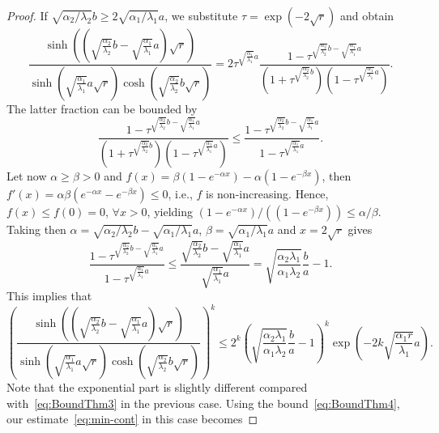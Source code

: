 \documentclass[10pt,a4paper]{amsart}
\begin{document}
\begin{proof}
If $\sqrt{\alpha_2/\lambda_2} b \geq 2\sqrt{\alpha_1/\lambda_1} a$, we substitute $\tau=\exp(-2\sqrt{r})$ and obtain 
\[\frac{\sinh\left(\left(\sqrt{\frac{\alpha_2}{\lambda_2}} b - \sqrt{\frac{\alpha_1}{\lambda_1}} a \right) \sqrt{r} \right)}{\sinh\left(\sqrt{\frac{\alpha_1}{\lambda_1}} a \sqrt{r}\right)\cosh\left(\sqrt{\frac{\alpha_2}{\lambda_2}} b \sqrt{r}\right)}
= 2 \tau^{\sqrt{\frac{\alpha_1}{\lambda_1}} a}\frac{1-\tau^{\sqrt{\frac{\alpha_2}{\lambda_2}} b-\sqrt{\frac{\alpha_1}{\lambda_1}} a}}{\left(1+\tau^{\sqrt{\frac{\alpha_2}{\lambda_2}} b}\right)\left(1-\tau^{\sqrt{\frac{\alpha_1}{\lambda_1}} a}\right)}.\] 
The latter fraction can be bounded by
\[\frac{1-\tau^{\sqrt{\frac{\alpha_2}{\lambda_2}} b-\sqrt{\frac{\alpha_1}{\lambda_1}} a}}{\left(1+\tau^{\sqrt{\frac{\alpha_2}{\lambda_2}} b}\right)\left(1-\tau^{\sqrt{\frac{\alpha_1}{\lambda_1}} a}\right)} 
\leq \frac{1-\tau^{\sqrt{\frac{\alpha_2}{\lambda_2}} b-\sqrt{\frac{\alpha_1}{\lambda_1}} a}}{1-\tau^{\sqrt{\frac{\alpha_1}{\lambda_1}} a}}.\] 
Let now $\alpha \geq \beta >0$ and $f(x) = \beta(1 - e^{-\alpha x}) - \alpha(1 - e^{-\beta x})$, then $f'(x) = \alpha\beta(e^{-\alpha x} - e^{-\beta x}) \leq 0$, i.e., $f$ is non-increasing. Hence, $f(x) \leq f(0) = 0$, $\forall x > 0$, yielding $(1 - e^{-\alpha x})/((1 - e^{-\beta x})) \leq \alpha/\beta$. Taking then $\alpha = \sqrt{\alpha_2/\lambda_2} b - \sqrt{\alpha_1/\lambda_1} a$, $\beta = \sqrt{\alpha_1/\lambda_1} a$ and $x = 2\sqrt{r}$ gives
\begin{equation}\label{eq:bound-exp}
	\frac{1-\tau^{\sqrt{\frac{\alpha_2}{\lambda_2}} b-\sqrt{\frac{\alpha_1}{\lambda_1}} a}}{1-\tau^{\sqrt{\frac{\alpha_1}{\lambda_1}} a}} 
	\leq \frac{\sqrt{\frac{\alpha_2}{\lambda_2}} b-\sqrt{\frac{\alpha_1}{\lambda_1}} a}{\sqrt{\frac{\alpha_1}{\lambda_1}} a} = \sqrt{\frac{\alpha_2 \lambda_1}{\alpha_1\lambda_2}}\frac{b}{a} - 1.
\end{equation} 
This implies that 
\begin{equation}\label{eq:BoundThm4}
\left(\frac{\sinh\left(\left(\sqrt{\frac{\alpha_2}{\lambda_2}} b - \sqrt{\frac{\alpha_1}{\lambda_1}} a \right) \sqrt{r} \right)}{\sinh\left(\sqrt{\frac{\alpha_1}{\lambda_1}} a \sqrt{r}\right)\cosh\left(\sqrt{\frac{\alpha_2}{\lambda_2}} b \sqrt{r}\right)}\right)^k
\leq 2^k \left(\sqrt{\frac{\alpha_2 \lambda_1}{\alpha_1\lambda_2}}\frac{b}{a} - 1\right)^k \exp\left(-2k\sqrt{\frac{\alpha_1r}{\lambda_1}} a\right).
\end{equation} 
Note that the exponential part is slightly different compared with~\eqref{eq:BoundThm3} in the previous case. Using the bound~\eqref{eq:BoundThm4}, our estimate~\eqref{eq:min-cont} in this case becomes

\end{proof}
\end{document}
